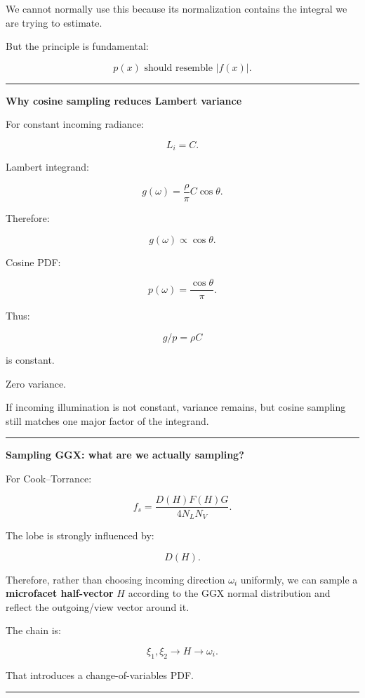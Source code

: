 We cannot normally use this because its normalization contains the integral we are trying to estimate.

But the principle is fundamental:

\[
\boxed{
p(x)\text{ should resemble }|f(x)|.
}
\]

\begin{center}\rule{0.5\linewidth}{0.5pt}\end{center}

\textbf{Why cosine sampling reduces Lambert variance}

For constant incoming radiance:

\[
L_i=C.
\]

Lambert integrand:

\[
g(\omega)
=
\frac{\rho}{\pi}
C
\cos\theta.
\]

Therefore:

\[
g(\omega)\propto\cos\theta.
\]

Cosine PDF:

\[
p(\omega)
=
\frac{\cos\theta}{\pi}.
\]

Thus:

\[
g/p
=
\rho C
\]

is constant.

Zero variance.

If incoming illumination is not constant, variance remains, but cosine sampling still matches one major factor of the integrand.

\begin{center}\rule{0.5\linewidth}{0.5pt}\end{center}

\textbf{Sampling GGX: what are we actually sampling?}

For Cook--Torrance:

\[
f_s=
\frac{D(H)F(H)G}{4N_LN_V}.
\]

The lobe is strongly influenced by:

\[
D(H).
\]

Therefore, rather than choosing incoming direction \(\omega_i\) uniformly, we can sample a \textbf{microfacet half-vector} \(H\) according to the GGX normal distribution and reflect the outgoing/view vector around it.

The chain is:

\[
\xi_1,\xi_2
\rightarrow
H
\rightarrow
\omega_i.
\]

That introduces a change-of-variables PDF.

\begin{center}\rule{0.5\linewidth}{0.5pt}\end{center}

